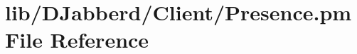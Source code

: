 \hypertarget{_client_2_presence_8pm}{
\section{lib/\-D\-Jabberd/\-Client/\-Presence.pm \-File \-Reference}
\label{_client_2_presence_8pm}
}
